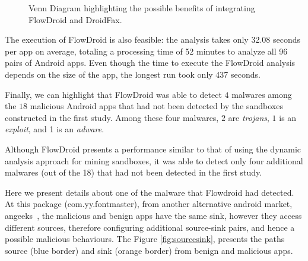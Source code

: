 \begin{figure}
  \caption{Venn Diagram highlighting the possible benefits of
    integrating FlowDroid and DroidFax.}
  \label{fig:venn-plot2}

\end{figure}

The execution of FlowDroid is also feasible: the analysis takes only
32.08 seconds per app on average, totaling a processing time of 52
minutes to analyze all 96 pairs of Android apps.
Even though the time to execute the FlowDroid analysis depends on the size
of the app, the longest run took only 437 seconds. 

Finally, we can highlight that FlowDroid was able to detect $4$ malwares among the $18$ malicious Android apps that had not
been detected by the sandboxes constructed in the first study. Among these
four malwares, $2$ are \emph{trojans}, $1$ is an \emph{exploit}, and 1 is an \emph{adware}.

\begin{finding}
  Although FlowDroid presents a performance similar
  to that of using the dynamic analysis approach for mining sandboxes,
  it was able to detect only four additional malwares (out of the
  18) that had not been detected in the first study. 
\end{finding}

Here we present details about one of the malware that Flowdroid had detected. At this package (com.yy.fontmaster), from another alternative android market, angeeks~\cite{angeeks}, the malicious and benign apps have the same sink, however they access different sources, therefore configuring additional source-sink pairs, and hence a possible malicious behaviours. The Figure \ref{fig:sourcesink}, presents the paths source (blue border) and sink (orange border) from benign and malicious apps.

